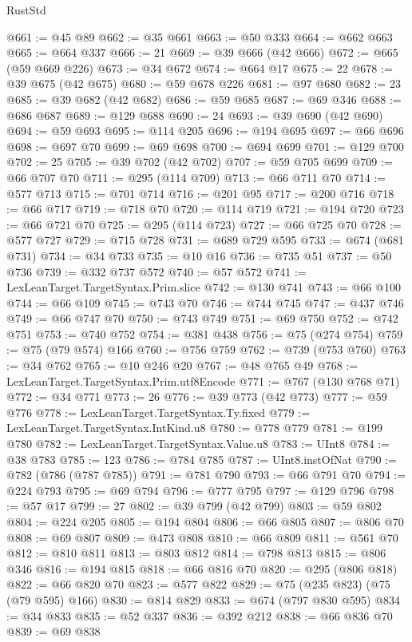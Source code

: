 \begin{lexlean}{RustStd}
\begin{coremodule}
{\begin{coremodule}
{{{{{{{{{{{{{{{{{{{{{{{{{{{{{{{{{{{{{{{{{{{@661 := @45 @89
@662 := @35 @661
@663 := @50 @333
@664 := @662 @663
@665 := @664 @337
@666 := 21
@669 := @39 @666 (@42 @666)
@672 := @665 (@59 @669 @226)
@673 := @34 @672
@674 := @664 @17
@675 := 22
@678 := @39 @675 (@42 @675)
@680 := @59 @678 @226
@681 := @97 @680
@682 := 23
@685 := @39 @682 (@42 @682)
@686 := @59 @685
@687 := @69 @346
@688 := @686 @687
@689 := @129 @688
@690 := 24
@693 := @39 @690 (@42 @690)
@694 := @59 @693
@695 := @114 @205
@696 := @194 @695
@697 := @66 @696
@698 := @697 @70
@699 := @69 @698
@700 := @694 @699
@701 := @129 @700
@702 := 25
@705 := @39 @702 (@42 @702)
@707 := @59 @705 @699
@709 := @66 @707 @70
@711 := @295 (@114 @709)
@713 := @66 @711 @70
@714 := @577 @713
@715 := @701 @714
@716 := @201 @95
@717 := @200 @716
@718 := @66 @717
@719 := @718 @70
@720 := @114 @719
@721 := @194 @720
@723 := @66 @721 @70
@725 := @295 (@114 @723)
@727 := @66 @725 @70
@728 := @577 @727
@729 := @715 @728
@731 := @689 @729 @595
@733 := @674 (@681 @731)
@734 := @34 @733
@735 := @10 @16
@736 := @735 @51
@737 := @50 @736
@739 := @332 @737 @572
@740 := @57 @572
@741 := LexLeanTarget.TargetSyntax.Prim.slice
@742 := @130 @741
@743 := @66 @100
@744 := @66 @109
@745 := @743 @70
@746 := @744 @745
@747 := @437 @746
@749 := @66 @747 @70
@750 := @743 @749
@751 := @69 @750
@752 := @742 @751
@753 := @740 @752
@754 := @381 @438
@756 := @75 (@274 @754)
@759 := @75 (@79 @574) @166
@760 := @756 @759
@762 := @739 (@753 @760)
@763 := @34 @762
@765 := @10 @246 @20
@767 := @48 @765 @49
@768 := LexLeanTarget.TargetSyntax.Prim.utf8Encode
@771 := @767 (@130 @768 @71)
@772 := @34 @771
@773 := 26
@776 := @39 @773 (@42 @773)
@777 := @59 @776
@778 := LexLeanTarget.TargetSyntax.Ty.fixed
@779 := LexLeanTarget.TargetSyntax.IntKind.u8
@780 := @778 @779
@781 := @199 @780
@782 := LexLeanTarget.TargetSyntax.Value.u8
@783 := UInt8
@784 := @38 @783
@785 := 123
@786 := @784 @785
@787 := UInt8.instOfNat
@790 := @782 (@786 (@787 @785))
@791 := @781 @790
@793 := @66 @791 @70
@794 := @224 @793
@795 := @69 @794
@796 := @777 @795
@797 := @129 @796
@798 := @57 @17
@799 := 27
@802 := @39 @799 (@42 @799)
@803 := @59 @802
@804 := @224 @205
@805 := @194 @804
@806 := @66 @805
@807 := @806 @70
@808 := @69 @807
@809 := @473 @808
@810 := @66 @809
@811 := @561 @70
@812 := @810 @811
@813 := @803 @812
@814 := @798 @813
@815 := @806 @346
@816 := @194 @815
@818 := @66 @816 @70
@820 := @295 (@806 @818)
@822 := @66 @820 @70
@823 := @577 @822
@829 := @75 (@235 @823) (@75 (@79 @595) @166)
@830 := @814 @829
@833 := @674 (@797 @830 @595)
@834 := @34 @833
@835 := @52 @337
@836 := @392 @212
@838 := @66 @836 @70
@839 := @69 @838
}}}}}}}}}}}}}}}}}}}}}}}}}}}}}}}}}}}}}}}}}}}
\end{coremodule}}
\end{coremodule}
\end{lexlean}
